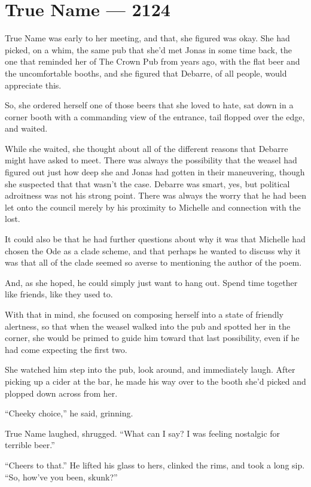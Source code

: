 \hypertarget{true-name-2124}{%
\chapter{True Name — 2124}\label{true-name-2124}}

True Name was early to her meeting, and that, she figured was okay. She had picked, on a whim, the same pub that she'd met Jonas in some time back, the one that reminded her of The Crown Pub from years ago, with the flat beer and the uncomfortable booths, and she figured that Debarre, of all people, would appreciate this.

So, she ordered herself one of those beers that she loved to hate, sat down in a corner booth with a commanding view of the entrance, tail flopped over the edge, and waited.

While she waited, she thought about all of the different reasons that Debarre might have asked to meet. There was always the possibility that the weasel had figured out just how deep she and Jonas had gotten in their maneuvering, though she suspected that that wasn't the case. Debarre was smart, yes, but political adroitness was not his strong point. There was always the worry that he had been let onto the council merely by his proximity to Michelle and connection with the lost.

It could also be that he had further questions about why it was that Michelle had chosen the Ode as a clade scheme, and that perhaps he wanted to discuss why it was that all of the clade seemed so averse to mentioning the author of the poem.

And, as she hoped, he could simply just want to hang out. Spend time together like friends, like they used to.

With that in mind, she focused on composing herself into a state of friendly alertness, so that when the weasel walked into the pub and spotted her in the corner, she would be primed to guide him toward that last possibility, even if he had come expecting the first two.

She watched him step into the pub, look around, and immediately laugh. After picking up a cider at the bar, he made his way over to the booth she'd picked and plopped down across from her.

``Cheeky choice,'' he said, grinning.

True Name laughed, shrugged. ``What can I say? I was feeling nostalgic for terrible beer.''

``Cheers to that.'' He lifted his glass to hers, clinked the rims, and took a long sip. ``So, how've you been, skunk?''

